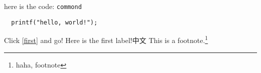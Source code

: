 \documentclass[cjk]{article}
\begin{document}
\begin{CJK*}{UTF8}{gkai}
  here is the code: \verb|commond|
  \begin{verbatim}
  printf("hello, world!");
  \end{verbatim}
  Click \pageref{first} \ref{first} and go!
  \newpage
  \label{first}
  Here is the first label!中文
  This is a footnote.\footnote{haha, footnote}

\end{CJK*}
\end{document}
